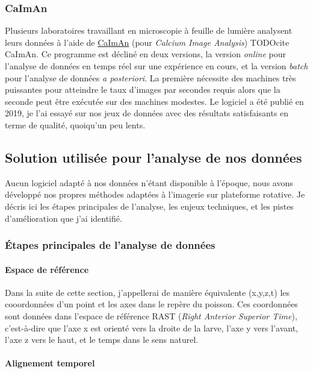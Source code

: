 \subsubsection{CaImAn}

Plusieurs laboratoires travaillant en microscopie à feuille de lumière analysent leurs données à l'aide de \href{https://github.com/flatironinstitute/CaImAn}{CaImAn} (pour \emph{Calcium Image Analysis}) TODOcite CaImAn. Ce programme est décliné en deux versions, la version \emph{online} pour l'analyse de données en temps réel sur une expérience en cours, et la version \emph{batch} pour l'analyse de données \emph{a posteriori}. La première nécessite des machines très puissantes pour atteindre le taux d'images par secondes requis alors que la seconde peut être exécutée sur des machines modestes. Le logiciel a été publié en 2019, je l'ai essayé sur nos jeux de données avec des résultats satisfaisants en terme de qualité, quoiqu'un peu lents.

\subsection{Solution utilisée pour l'analyse de nos données}

Aucun logiciel adapté à nos données n'étant disponible à l'époque, nous avons développé nos propres méthodes adaptées à l'imagerie sur plateforme rotative. Je décris ici les étapes principales de l'analyse, les enjeux techniques, et les pistes d'amélioration que j'ai identifié.

\subsubsection{Étapes principales de l'analyse de données}

\paragraph{Espace de référence}

Dans la suite de cette section, j'appellerai de manière équivalente (x,y,z,t) les cooordonnées d'un point et les axes dans le repère du poisson. Ces coordonnées sont données dans l'espace de référence RAST (\emph{Right Anterior Superior Time}), c'est-à-dire que l'axe x est orienté vers la droite de la larve, l'axe y vers l'avant, l'axe z vers le haut, et le temps dans le sens naturel.


\paragraph{Alignement temporel}

